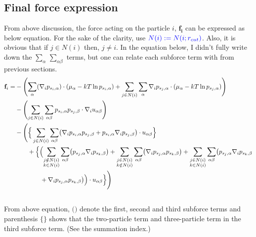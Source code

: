 \documentclass[11pt, oneside]{article}   	%
\begin{document}
 \subsection{Final force expression}
 From above discussion, the force acting on the particle $i$, $\mathbf{f_i}$ can be expressed as below equation. For the sake of the clarity, use $\color{blue} N(i) := N(i;r_{cut})$. Also, it is obvious that if $j \in N(i)$ then, $j \neq i$. In the equation below, I didn't fully write down the $\sum_{\alpha} \, \sum_{\alpha \beta}$ terms, but one can relate each subforce term with from previous sections.
 \begin{align} \notag
 \mathbf{f}_i =& -\Biggl( \sum_\alpha(\nabla_i p_{s_i,\alpha})\cdot(\mu_\alpha-kT \ln p_{s_i,\alpha}) +\sum_{j \in N(i)}\sum_\alpha \nabla_i p_{s_j,\alpha} \cdot (\mu_\alpha-kT \ln p_{s_j,\alpha})\Biggr) \\ \notag
 &-\Biggl( \sum_{j \in N(i)} \sum_{\alpha \beta} p_{s_i,\alpha}p_{s_j,\beta} \cdot \nabla_i u_{\alpha\beta} \Biggr) \\ \notag
 & - \Biggl( \Big\{ \sum_{j \in N(i)}  \sum_{\alpha \beta} \bigl( \nabla_i p_{s_i,\alpha} p_{s_j,\beta}+  p_{s_i,\alpha} \nabla_i p_{s_j,\beta} \bigr) \cdot u_{\alpha \beta} \Big\} \\ \notag
 & \qquad+ \Big\{\Bigl( \sum_{\substack{j \notin N(i) \\ k \in N(i)}} \sum_{\alpha \beta} \bigl( p_{s_j,\alpha} \nabla_i p_{s_k,\beta} \bigr) + \sum_{\substack{j \in N(i) \\ k \notin N(i)}} \sum_{\alpha \beta} \bigl( \nabla_ip_{s_j,\alpha}  p_{s_k,\beta} \bigr)+ \sum_{\substack{j \in N(i) \\ k \in N(i)}} \sum_{\alpha \beta} \bigl(p_{s_j,\alpha} \nabla_i p_{s_k,\beta} \\ \notag
& \qquad \qquad+ \nabla_ip_{s_j,\alpha}  p_{s_k,\beta} \bigr) \Bigr)  \cdot u_{\alpha\beta}\Big\} \Biggr)  \\ \notag
  \end{align}
From above equation, $\Biggl(\Biggr)$ denote the first, second and third subforce terms and parenthesis $\Big\{\Big\}$ shows that the two-particle term and three-particle term in the third subforce term. (See the summation index.)
\end{document}
